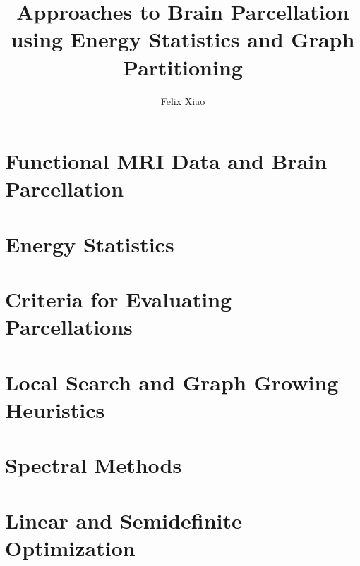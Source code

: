 \documentclass{report}
\title{Approaches to Brain Parcellation using Energy Statistics and Graph Partitioning}
\author{Felix Xiao}
\begin{document}
\maketitle
\tableofcontents

\chapter{Functional MRI Data and Brain Parcellation}


\chapter{Energy Statistics}


\chapter{Criteria for Evaluating Parcellations}


\chapter{Local Search and Graph Growing Heuristics}


\chapter{Spectral Methods}


\chapter{Linear and Semidefinite Optimization}

\end{document}
